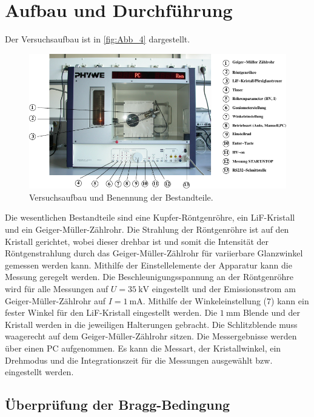 \section{Aufbau und Durchführung}
\label{sec:Durchführung}

Der Versuchsaufbau ist in \autoref{fig:Abb_4} dargestellt.
\begin{figure}[H]
    \centering
    \includegraphics[width=\textwidth]{build/Abb_4.pdf}
    \caption{Versuchsaufbau und Benennung der Bestandteile.\cite{V602}}
    \label{fig:Abb_4}
\end{figure}

Die wesentlichen Bestandteile sind eine Kupfer-Röntgenröhre, ein LiF-Kristall und ein Geiger-Müller-Zählrohr.
Die Strahlung der Röntgenröhre ist auf den Kristall gerichtet, wobei dieser drehbar ist und somit die Intensität der 
Röntgenstrahlung durch das Geiger-Müller-Zählrohr für variierbare Glanzwinkel gemessen werden kann.
Mithilfe der Einstellelemente der Apparatur kann die Messung geregelt werden. Die Beschleunigungsspannung an der Röntgenröhre
wird für alle Messungen auf $U = \qty{35}{\kilo\volt}$ eingestellt und der Emissionsstrom am Geiger-Müller-Zählrohr auf $I = \qty{1}{\milli\ampere}$.
Mithilfe der Winkeleinstellung ($7$) kann ein fester Winkel für den LiF-Kristall eingestellt werden.
Die $\qty{1}{\milli\meter}$ Blende und der Kristall werden in die jeweiligen Halterungen gebracht.
Die Schlitzblende muss waagerecht auf dem Geiger-Müller-Zählrohr sitzen.
Die Messergebnisse werden über einen PC aufgenommen. 
Es kann die Messart, der Kristallwinkel, ein Drehmodus und die Integrationszeit für die Messungen ausgewählt bzw. eingestellt werden.


\subsection{Überprüfung der Bragg-Bedingung} %
\label{sub:Bragg_durch}


